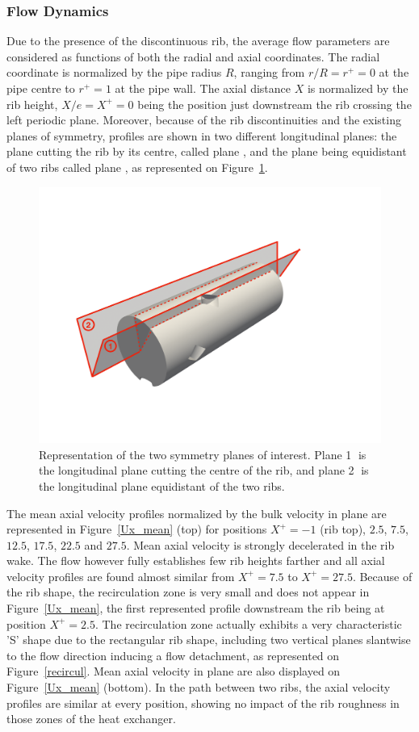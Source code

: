 \subsubsection{Flow Dynamics}

Due to the presence of the discontinuous rib, the average flow parameters are considered as functions of both the radial and axial coordinates. The radial coordinate is normalized by the pipe radius $R$, ranging from $r/R=r^+=0$ at the pipe centre to $r^+=1$ at the pipe wall. The axial distance $X$ is normalized by the rib height, $X/e=X^+=0$ being the position just downstream the rib crossing the left periodic plane. Moreover, because of the rib discontinuities and the existing planes of symmetry, profiles are shown in two different longitudinal planes: the plane cutting the rib by its centre, called plane , and the plane being equidistant of two ribs called plane , as represented on Figure~\ref{planes}.

\begin{figure}[!h]
\centering
\includegraphics[width=0.6\linewidth,keepaspectratio]{fig/applications/optim/PlaneS.pdf}
\caption{Representation of the two symmetry planes of interest. Plane \textcircled{1} is the longitudinal plane cutting the centre of the rib, and plane \textcircled{2} is the longitudinal plane equidistant of the two ribs.}
\label{planes}
\end{figure}

The mean axial velocity profiles normalized by the bulk velocity in plane  are represented in Figure~\ref{Ux_mean} (top) for positions $X^+=-1$ (rib top), $2.5$, $7.5$, $12.5$, $17.5$, $22.5$ and $27.5$. Mean axial velocity is strongly decelerated in the rib wake. The flow however fully establishes few rib heights farther and all axial velocity profiles are found almost similar from $X^+=7.5$ to $X^+=27.5$. Because of the rib shape, the recirculation zone is very small and does not appear in Figure~\ref{Ux_mean}, the first represented profile downstream the rib being at position $X^+=2.5$. The recirculation zone actually exhibits a very characteristic 'S' shape due to the rectangular rib shape, including two vertical planes slantwise to the flow direction inducing a flow detachment, as represented on Figure~\ref{recircul}. Mean axial velocity in plane  are also displayed on Figure~\ref{Ux_mean} (bottom). In the path between two ribs, the axial velocity profiles are similar at every position, showing no impact of the rib roughness in those zones of the heat exchanger.

